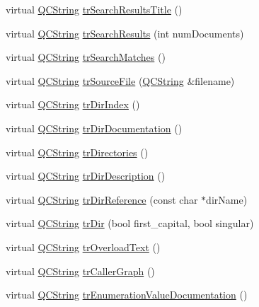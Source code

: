 \begin{DoxyCompactItemize}
virtual \hyperlink{class_q_c_string}{Q\-C\-String} \hyperlink{class_translator_swedish_a711c6a2b5461f1f055d00611ea3a0533}{tr\-Search\-Results\-Title} ()
\item 
virtual \hyperlink{class_q_c_string}{Q\-C\-String} \hyperlink{class_translator_swedish_ae43fbd8a6b08b331a6586422bd8c465e}{tr\-Search\-Results} (int num\-Documents)
\item 
virtual \hyperlink{class_q_c_string}{Q\-C\-String} \hyperlink{class_translator_swedish_a0677855fd52afcda6d47b2cc51e7de31}{tr\-Search\-Matches} ()
\item 
virtual \hyperlink{class_q_c_string}{Q\-C\-String} \hyperlink{class_translator_swedish_a1b3571c6c75d16ebe3763f510bd95b68}{tr\-Source\-File} (\hyperlink{class_q_c_string}{Q\-C\-String} \&filename)
\item 
virtual \hyperlink{class_q_c_string}{Q\-C\-String} \hyperlink{class_translator_swedish_ae9895001e5d8629fd068895b2ffa653f}{tr\-Dir\-Index} ()
\item 
virtual \hyperlink{class_q_c_string}{Q\-C\-String} \hyperlink{class_translator_swedish_a89a223d69d1255271719c256b2fd451b}{tr\-Dir\-Documentation} ()
\item 
virtual \hyperlink{class_q_c_string}{Q\-C\-String} \hyperlink{class_translator_swedish_ab7610b46aedb923a1524272dfbaeab38}{tr\-Directories} ()
\item 
virtual \hyperlink{class_q_c_string}{Q\-C\-String} \hyperlink{class_translator_swedish_abf769d2a217fcf6b9d3b9170fbbae7c8}{tr\-Dir\-Description} ()
\item 
virtual \hyperlink{class_q_c_string}{Q\-C\-String} \hyperlink{class_translator_swedish_ae680136bec0ce1d29a1e4e00d871797f}{tr\-Dir\-Reference} (const char $\ast$dir\-Name)
\item 
virtual \hyperlink{class_q_c_string}{Q\-C\-String} \hyperlink{class_translator_swedish_abb2b35bd374b96530198bf061054c951}{tr\-Dir} (bool first\-\_\-capital, bool singular)
\item 
virtual \hyperlink{class_q_c_string}{Q\-C\-String} \hyperlink{class_translator_swedish_ac5436cb286c48cd540d0cdce200a82b9}{tr\-Overload\-Text} ()
\item 
virtual \hyperlink{class_q_c_string}{Q\-C\-String} \hyperlink{class_translator_swedish_ae1d7d38cc426cd25124b1658b1125841}{tr\-Caller\-Graph} ()
\item 
virtual \hyperlink{class_q_c_string}{Q\-C\-String} \hyperlink{class_translator_swedish_a4039294191fddf0e9530b920719998fd}{tr\-Enumeration\-Value\-Documentation} ()
\item 

\end{DoxyCompactItemize}
